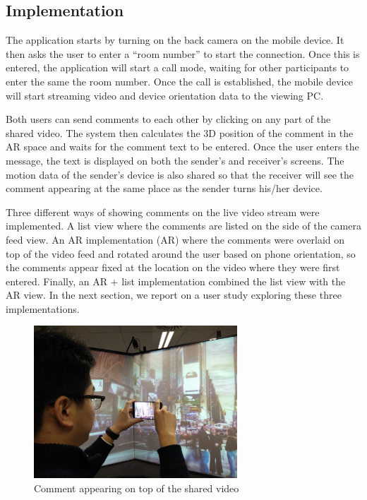 \subsection{Implementation}

The application starts by turning on the back camera on the mobile device. It then asks the user to enter a “room number” to start the connection. Once this is entered, the application will start a call mode, waiting for other participants to enter the same the room number. Once the call is established, the mobile device will start streaming video and device orientation data to the viewing PC. 

Both users can send comments to each other by clicking on any part of the shared video. The system then calculates the 3D position of the comment in the AR space and waits for the comment text to be entered. Once the user enters the message, the text is displayed on both the sender's and receiver's screens. The motion data of the sender's device is also shared so that the receiver will see the comment appearing at the same place as the sender turns his/her device. 

Three different ways of showing comments on the live video stream were implemented. A list view where the comments are listed on the side of the camera feed view. An AR implementation (AR) where the comments were overlaid on top of the video feed and rotated around the user based on phone orientation, so the comments appear fixed at the location on the video where they were first entered. Finally, an AR + list implementation combined the list view with the AR view. In the next section, we report on a user study exploring these three implementations.

\begin{figure}[ht]
  \centering
  \includegraphics[width=3in]{images/mgia16/participant2}
  \caption{Comment appearing on top of the shared video}
	\label{comments}
\end{figure}


